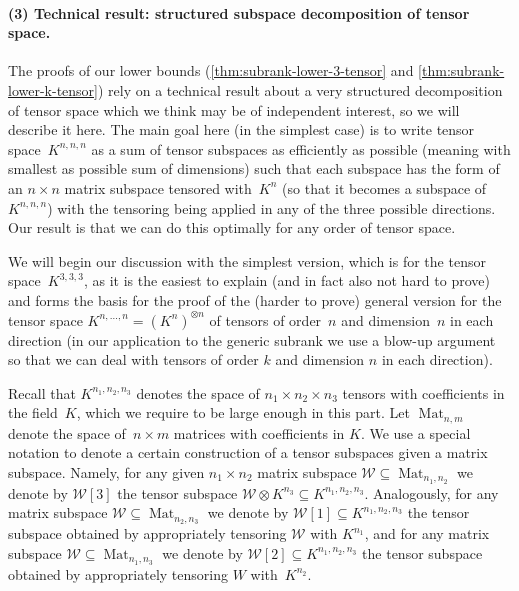 \documentclass[10pt,a4paper]{article}
\theoremstyle{definition}
\theoremstyle{remark}
\newcommand{\Mat}{\operatorname{Mat}}
\begin{document}
\paragraph{(3) Technical result: structured subspace decomposition of tensor space.}

The proofs of our lower bounds (\autoref{thm:subrank-lower-3-tensor} and \autoref{thm:subrank-lower-k-tensor}) rely on a technical result about a very structured decomposition of tensor space which we think may be of independent interest, so we will describe it here. The main goal here (in the simplest case) is to write tensor space~$K^{n, n, n}$ as a sum of tensor subspaces as efficiently as possible (meaning with smallest as possible sum of dimensions) such that each subspace has the form of an $n \times n$ matrix subspace tensored with~$K^n$ (so that it becomes a subspace of $K^{n,n,n}$) with the tensoring being applied in any of the three possible directions. Our result is that we can do this optimally for any order of tensor space.

We will begin our discussion with the simplest version, which is for the tensor space~$K^{3,3,3}$, as it is the easiest to explain (and in fact also not hard to prove) and forms the basis for the proof of the (harder to prove) general version for the tensor space $K^{n,\ldots, n} = (K^n)^{\otimes n}$ of tensors of order~$n$ and dimension~$n$ in each direction (in our application to the generic subrank we use a blow-up argument so that we can deal with tensors of order $k$ and dimension $n$ in each direction). 

Recall that $K^{n_1, n_2, n_3}$ denotes the space of $n_1 \times n_2 \times n_3$ tensors with coefficients in the field~$K$, which we require to be large enough in this part. Let $\Mat_{n,m}$ denote the space of~$n \times m$ matrices with coefficients in $K$.
We use a special notation to denote a certain construction of a tensor subspaces given a matrix subspace. Namely, for any given $n_1 \times n_2$ matrix subspace $\mathcal{W} \subseteq \Mat_{n_1, n_2}$ we denote by $\mathcal{W}[3]$ the tensor subspace $\mathcal{W} \otimes K^{n_3} \subseteq K^{n_1, n_2, n_3}$. Analogously, for any matrix subspace $\mathcal{W} \subseteq \Mat_{n_2, n_3}$ we denote by $\mathcal{W}[1] \subseteq K^{n_1, n_2, n_3}$ the tensor subspace obtained by appropriately tensoring $\mathcal{W}$ with $K^{n_1}$, and for any matrix subspace $\mathcal{W} \subseteq \Mat_{n_1, n_3}$ we denote by $\mathcal{W}[2] \subseteq K^{n_1, n_2, n_3}$ the tensor subspace obtained by appropriately tensoring $W$ with~$K^{n_2}$.
\end{document}
